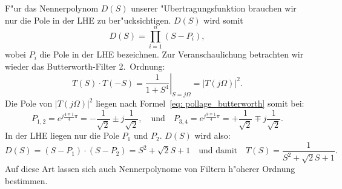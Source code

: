 \nit F"ur das Nennerpolynom $D(S)$ unserer "Ubertragungsfunktion brauchen wir nur
die Pole in der LHE zu ber"ucksichtigen. $D(S)$ wird somit
\begin{equation}
D(S)=\prod_{i=1}^{n} (S-P_{i}),
\end{equation}
wobei $P_{i}$ die Pole in der LHE bezeichnen.  Zur Veranschaulichung
betrachten wir wieder das Butterworth-Filter 2.~Ordnung:
\[ 
\left. T(S)\cdot T(-S)=\frac{1}{1+S^{4}}\right|_{{\displaystyle S=j\Omega}}=|T(j\Omega)|^{2}.
\]
Die Pole von $|T(j\Omega)|^{2}$ liegen nach Formel~\ref{eq: pollage_butterworth} somit bei:
\begin{equation*}
P_{1,2}=e^{j \frac{4\mp 1}{4}\pi}=-\frac{1}{\sqrt{2}}\pm j\frac{1}{\sqrt{2}},\quad\text{und}\quad
P_{3,4}=e^{j \frac{8\mp 1}{4}\pi}=+\frac{1}{\sqrt{2}}\mp j\frac{1}{\sqrt{2}}.
\end{equation*}
In der LHE liegen nur die Pole $P_{1}$ und $P_{2}$. $D(S)$ wird also:
\[
D(S)=(S-P_{1})\cdot(S-P_{2})=S^{2}+\sqrt{2}S+1\quad\mbox{und damit}\quad T(S)=\frac{1}{S^{2}+\sqrt{2}S+1}.
\]
Auf diese Art lassen sich auch Nennerpolynome von Filtern h"oherer Ordnung bestimmen.
